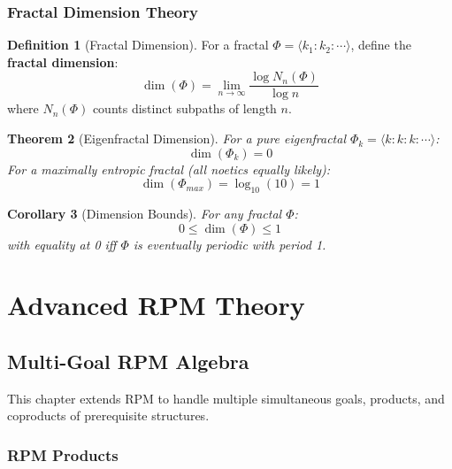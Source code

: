 \documentclass[11pt,twoside,openright]{book}
\theoremstyle{definition}
\newtheorem{definition}{Definition}[chapter]
\theoremstyle{plain}
\newtheorem{theorem}[definition]{Theorem}
\newtheorem{corollary}[definition]{Corollary}
\theoremstyle{remark}
\newcommand{\Frac}{\Phi}
\newcommand{\vnewone}{\textbf{v7.1 New}}
\begin{document}
\section{Fractal Dimension Theory}

\begin{definition}[Fractal Dimension]
\label{def:fractal-dim}
For a fractal $\Frac = \langle k_1 : k_2 : \cdots \rangle$, define the \textbf{fractal dimension}:
\[
\dim(\Frac) = \lim_{n \to \infty} \frac{\log N_n(\Frac)}{\log n}
\]
where $N_n(\Frac)$ counts distinct subpaths of length $n$.
\end{definition}

\begin{theorem}[Eigenfractal Dimension]
\label{thm:eigenfractal-dim}
For a pure eigenfractal $\Frac_k = \langle k : k : k : \cdots \rangle$:
\[
\dim(\Frac_k) = 0
\]
For a maximally entropic fractal (all noetics equally likely):
\[
\dim(\Frac_{max}) = \log_{10}(10) = 1
\]
\end{theorem}

\begin{corollary}[Dimension Bounds]
\label{cor:dim-bounds}
For any fractal $\Frac$:
\[
0 \leq \dim(\Frac) \leq 1
\]
with equality at 0 iff $\Frac$ is eventually periodic with period 1.
\end{corollary}

\part{Advanced RPM Theory}

\chapter{Multi-Goal RPM Algebra}
\label{ch:multi-goal-rpm}

\begin{tcolorbox}[colback=blue!5!white,colframe=blue!75!black,title=\vnewone]
This chapter extends RPM to handle multiple simultaneous goals, products, and coproducts of prerequisite structures.
\end{tcolorbox}

\section{RPM Products}
\end{document}
